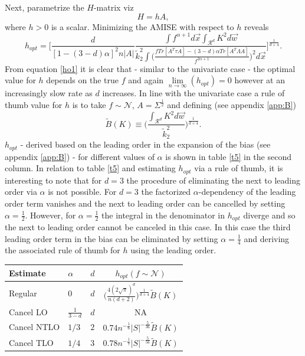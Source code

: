 \documentclass[
twoside,
openright,
titlepage,
numbers=noenddot,
headinclude,%
footinclude=true,
dottedtoc, %
ngerman,
american, %
pagesize=pdftex,
]{book}
\begin{document}
	Next, parametrize the $H$-matrix viz
	\begin{equation}
		H=hA,
		\label{H}
	\end{equation}
	where $h>0$ is a scalar. Minimizing the AMISE with respect to $h$ reveals
	\begin{equation}
		h_{opt}= \bigg[\frac{d}{[1-(3-d)\alpha]^2n|A|}\frac{\int f^{\alpha+1}d\vec{x}  \int_{\mathcal{R}^d} K^2d\vec{w}}{\tilde{k}_2^2\int \big(\frac{fTr[A^T\tau A]-(3-d)\alpha Tr[A^T\Lambda A]}{f^{2\alpha+1}}\big)^2d\vec{x}}\bigg]^{\frac{1}{d+4}}.
		\label{ho1}
	\end{equation}
	From equation \eqref{ho1} it is clear that - similar to the univariate case - the optimal value for $h$ depends on the true $f$ and again $\lim\limits_{n\rightarrow \infty}(h_{opt})=0$ however at an increasingly slow rate as $d$ increases. In line with the univariate case a rule of thumb value for $h$ is to take $f\sim\mathcal{N}$, $A=\Sigma^\frac{1}{2}$ and defining (see appendix \ref{app:B})
	\begin{equation}
		\tilde{B}(K)\equiv \bigg(\frac{\int_{\mathcal{R}^d} K^2d\vec{w}}{\tilde{k}_2^2}\bigg)^\frac{1}{d+4}.
	\end{equation} 
	$h_{opt}$ - derived based on the leading order in the expansion of the bias (see appendix \ref{app:B}) - for different values of $\alpha$ is shown in table \ref{t5} in the second column. In relation to table \ref{t5} and estimating $h_{opt}$ via a rule of thumb, it is interesting to note that for $d=3$ the procedure of eliminating the next to leading order via $\alpha$ is not possible. For $d=3$ the factorized $\alpha$-dependency of the leading order term vanishes and the next to leading order can be cancelled by setting $\alpha=\frac{1}{2}$. However, for $\alpha=\frac{1}{2}$ the integral in the denominator in $h_{opt}$ diverge and so the next to leading order cannot be canceled in this case. In this case the third leading order term in the bias can be eliminated by setting $\alpha=\frac{1}{4}$ and deriving the associated rule of thumb for $h$ using the leading order.
	\begin{center}
		\begin{tabular}{ l|l|l| c|}
			Estimate &$\alpha$ & $d$ & $h_{opt}(f\sim \mathcal{N})$  \\
			\hline
			Regular & $0$ & $d$ & $\big(\frac{4(2\sqrt{\pi})^d}{n(d+2)}\big)^\frac{1}{d+4}\tilde{B}(K)$  \\
			Cancel LO& $\frac{1}{3-d}$ & $d$ & NA\\
			Cancel NTLO &$1/3$ &$2$ & $0.74n^{-\frac{1}{6}}|S|^{-\frac{5}{36}}\tilde{B}(K)$ \\
			Cancel TLO &$1/4$ &$3$ & $0.78n^{-\frac{1}{7}}|S|^{-\frac{5}{56}}\tilde{B}(K)$ \\
		\end{tabular}
		\captionsetup{width=0.95\textwidth}
		\label{t5}
	\end{center}
\end{document}
